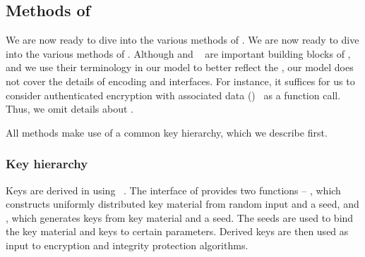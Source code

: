 \spacehack
\subsection{Methods of \mEdhoc{}}
\label{sec:methods}
\fillhack

We are now ready to dive into the various methods of \mEdhoc.
%
We are now ready to dive into the various methods of \mEdhoc. Although \mCose{} and \mCbor{}~\cite{rfc8152} are important building blocks of \mEdhoc{}, and we use their terminology in our model to better reflect the \mSpec{}, our model does not cover the details of encoding and \mCose{} interfaces. For instance, it suffices for us to consider authenticated encryption with associated data (\mAead{})~\cite{aead} as a function call. Thus, we omit details about \mCose{}.
%
%

All methods make use of a common key hierarchy, which we describe first. %
%

\spacehack
\subsubsection{Key hierarchy}
\label{sec:keyHierarchy}

Keys are derived in \mEdhoc{} using \mHkdf{}~\cite{rfc5869}.
%
The interface of \mHkdf{} provides two functions -- \mHkdfExtract{}, which constructs uniformly distributed key material from random input and a seed, and \mHkdfExpand{}, which generates keys from key material and a seed.
%
The seeds are used to bind the key material and keys to certain parameters. Derived keys are then used as input to encryption and integrity protection algorithms.
%
%


